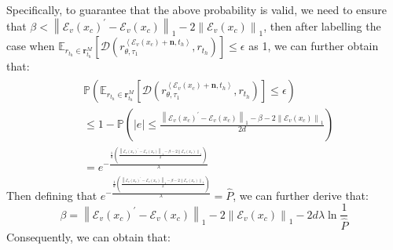 Specifically, to guarantee that the above probability is valid, we need to ensure that $\beta<\left\|\mathcal{E}_v(x_c)^{\prime}-\mathcal{E}_v(x_c)\right\|_1-2\left\|\mathcal{E}_v(x_c)\right\|_1$, then after labelling the case when $\mathbb{E}_{r_{t_h}\in\mathbf{r}_{t_h}^M}[\mathcal{D}(r_{\theta, \tau_1}^{\left<\mathcal{E}_v(x_c)+\mathbf{n}, t_h\right>}, r_{t_h})]\leq\epsilon$ as 1, we can further obtain that:
\begin{align}
\begin{split}
&\mathbb{P}(\mathbb{E}_{r_{t_h}\in\mathbf{r}_{t_h}^M}[\mathcal{D}(r_{\theta, \tau_1}^{\left<\mathcal{E}_v(x_c)+\mathbf{n}, t_h\right>}, r_{t_h})]\leq\epsilon)\\
&\leq1-\mathbb{P}(|e|\leq\frac{\left\|\mathcal{E}_v(x_c)^{\prime}-\mathcal{E}_v(x_c)\right\|_1-\beta-2\left\|\mathcal{E}_v(x_c)\right\|_1}{2d})\\
&=e^{-\frac{\frac{1}{d}(\frac{\left\|\mathcal{E}_v(x_c)^{\prime}-\mathcal{E}_v(x_c)\right\|_1-\beta-2\left\|\mathcal{E}_v(x_c)\right\|_1}{2})}{\lambda}}
\end{split}
\end{align}
Then defining that $e^{-\frac{\frac{1}{d}(\frac{\left\|\mathcal{E}_v(x_c)^{\prime}-\mathcal{E}_v(x_c)\right\|_1-\beta-2\left\|\mathcal{E}_v(x_c)\right\|_1}{2})}{\lambda}}=\hat{P}$, we can further derive that:
\begin{equation}
\beta = \left\|\mathcal{E}_v(x_c)^{\prime}-\mathcal{E}_v(x_c)\right\|_1-2\left\|\mathcal{E}_v(x_c)\right\|_1-2d\lambda\ln\frac{1}{\hat{P}}
\end{equation}
Consequently, we can obtain that:
